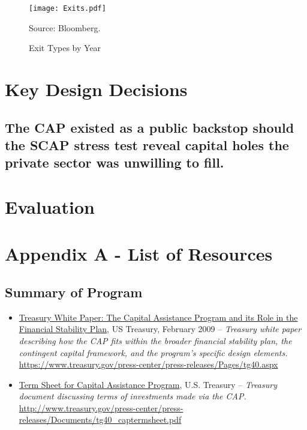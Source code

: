 \documentclass[12pt]{article}
\begin{document}
\begin{figure}[h]
\caption{Exit Types by Year}\label{exits}
\centering
\texttt{[image: Exits.pdf]}
\raggedright
\footnotesize Source: Bloomberg.
\end{figure}

\section{Key Design Decisions}

\subsection{The CAP existed as a public backstop should the SCAP stress test reveal capital holes the private sector was unwilling to fill.}

\section{Evaluation}




\nocite{*}


\section{Appendix A - List of Resources}

\subsection{Summary of Program}

\begin{itemize}

\item
\ul{Treasury White Paper: The Capital Assistance Program and its Role in the Financial Stability Plan}, US Treasury, February 2009 -- \emph{Treasury white paper describing how the CAP fits within the broader financial stability plan, the contingent capital framework, and the program's specific design elements.} \url{https://www.treasury.gov/press-center/press-releases/Pages/tg40.aspx}
\item
\ul{Term
  Sheet for Capital Assistance Program}, U.S. Treasury -- \emph{Treasury
  document discussing terms of investments made via the CAP.} \url{http://www.treasury.gov/press-center/press-releases/Documents/tg40_captermsheet.pdf}
\end{itemize}
\end{document}

